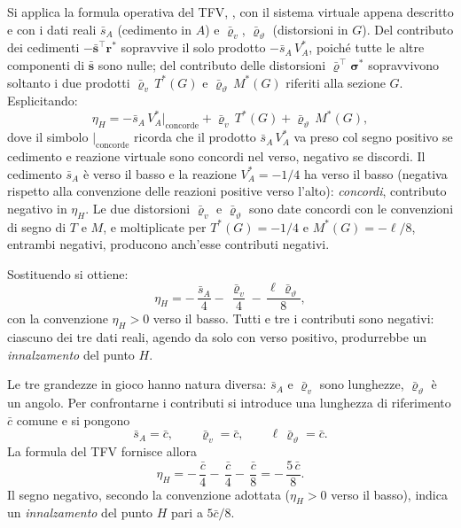 \begin{esempio}
\begin{svolgimento}
		
		Si applica la formula operativa del TFV, , 
		con il sistema virtuale appena descritto e con i dati reali 
		$\bar s_A$ (cedimento in $A$) e $\bar\varrho_v$, 
		$\bar\varrho_\vartheta$ (distorsioni in $G$). Del contributo dei 
		cedimenti $-\bar{\bm{s}}^\top\bm{r}^{*}$ sopravvive il solo 
		prodotto $-\bar s_A\,V_A^{*}$, poiché tutte le altre componenti 
		di $\bar{\bm s}$ sono nulle; del contributo delle distorsioni 
		$\bar{\bm{\varrho}}^\top\bm{\sigma}^{*}$ sopravvivono soltanto 
		i due prodotti $\bar\varrho_v\,T^{*}(G)$ e 
		$\bar\varrho_\vartheta\,M^{*}(G)$ riferiti alla sezione $G$. 
		Esplicitando:
		\begin{equation*}
			\eta_H = -\bar s_A\,V_A^{*}\big|_{\text{concorde}} 
			+ \bar\varrho_v\,T^{*}(G)
			+ \bar\varrho_\vartheta\,M^{*}(G),
		\end{equation*}
		dove il simbolo $\big|_{\text{concorde}}$ ricorda che il prodotto 
		$\bar s_A\,V_A^{*}$ va preso col segno positivo se cedimento e 
		reazione virtuale sono concordi nel verso, negativo se discordi. 
		Il cedimento $\bar s_A$ è verso il basso e la reazione 
		$V_A^{*}=-1/4$ ha verso il basso (negativa rispetto alla 
		convenzione delle reazioni positive verso l'alto): \emph{concordi}, 
		contributo negativo in $\eta_H$. Le due distorsioni $\bar\varrho_v$ 
		e $\bar\varrho_\vartheta$ sono date concordi con le convenzioni 
		di segno di $T$ e $M$, e moltiplicate per $T^{*}(G)=-1/4$ e 
		$M^{*}(G)=-\ell/8$, entrambi negativi, producono anch'esse 
		contributi negativi.
		
		Sostituendo si ottiene:
		\begin{equation*}
			\eta_H = 	-\,\frac{\bar s_A}{4} -\,\frac{\bar\varrho_v}{4} -\,\frac{\ell\,\bar\varrho_\vartheta}{8},
		\end{equation*}
		con la convenzione $\eta_H>0$ verso il basso. Tutti e tre i 
		contributi sono negativi: ciascuno dei tre dati reali, agendo 
		da solo con verso positivo, produrrebbe un \emph{innalzamento} 
		del punto $H$.
		
		
		Le tre grandezze in gioco hanno natura diversa: $\bar s_A$ e 
		$\bar\varrho_v$ sono lunghezze, $\bar\varrho_\vartheta$ è un 
		angolo. Per confrontarne i contributi si introduce una lunghezza 
		di riferimento $\bar c$ comune e si pongono
		\begin{equation*}
			\bar s_A = \bar c, \qquad
			\bar\varrho_v = \bar c, \qquad
			\ell\,\bar\varrho_\vartheta = \bar c.
		\end{equation*}
		La formula del TFV fornisce allora
		\begin{equation*}
			\eta_H = -\,\frac{\bar c}{4} -\,\frac{\bar c}{4} 
			-\,\frac{\bar c}{8} = -\,\frac{5\,\bar c}{8}.
		\end{equation*}
		Il segno negativo, secondo la convenzione adottata 
		($\eta_H>0$ verso il basso), indica un \emph{innalzamento} 
		del punto $H$ pari a $5\bar c/8$.
		

\end{svolgimento}
\end{esempio}
